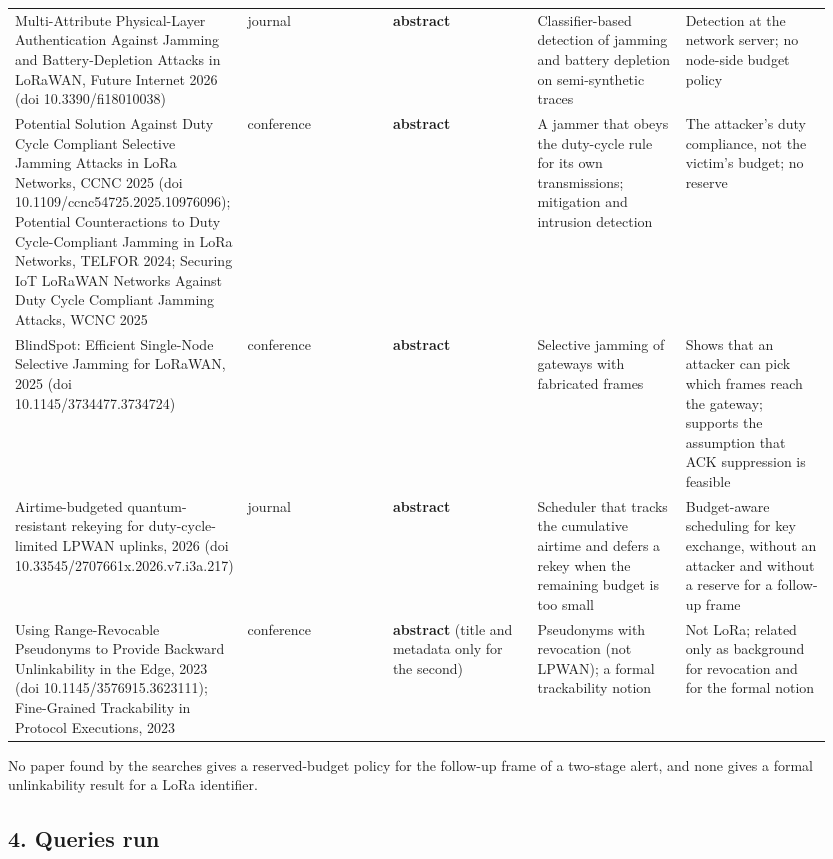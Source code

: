 {\begin{longtable}{p{0.190\linewidth}p{0.190\linewidth}p{0.190\linewidth}p{0.190\linewidth}p{0.190\linewidth}}
Multi-Attribute Physical-Layer Authentication Against Jamming and Battery-Depletion Attacks in LoRaWAN, Future Internet 2026 (doi 10.3390/fi18010038) & journal & \textbf{abstract} & Classifier-based detection of jamming and battery depletion on semi-synthetic traces & Detection at the network server; no node-side budget policy \\
Potential Solution Against Duty Cycle Compliant Selective Jamming Attacks in LoRa Networks, CCNC 2025 (doi 10.1109/ccnc54725.2025.10976096); Potential Counteractions to Duty Cycle-Compliant Jamming in LoRa Networks, TELFOR 2024; Securing IoT LoRaWAN Networks Against Duty Cycle Compliant Jamming Attacks, WCNC 2025 & conference & \textbf{abstract} & A jammer that obeys the duty-cycle rule for its own transmissions; mitigation and intrusion detection & The attacker's duty compliance, not the victim's budget; no reserve \\
BlindSpot: Efficient Single-Node Selective Jamming for LoRaWAN, 2025 (doi 10.1145/3734477.3734724) & conference & \textbf{abstract} & Selective jamming of gateways with fabricated frames & Shows that an attacker can pick which frames reach the gateway; supports the assumption that ACK suppression is feasible \\
Airtime-budgeted quantum-resistant rekeying for duty-cycle-limited LPWAN uplinks, 2026 (doi 10.33545/2707661x.2026.v7.i3a.217) & journal & \textbf{abstract} & Scheduler that tracks the cumulative airtime and defers a rekey when the remaining budget is too small & Budget-aware scheduling for key exchange, without an attacker and without a reserve for a follow-up frame \\
Using Range-Revocable Pseudonyms to Provide Backward Unlinkability in the Edge, 2023 (doi 10.1145/3576915.3623111); Fine-Grained Trackability in Protocol Executions, 2023 & conference & \textbf{abstract} (title and metadata only for the second) & Pseudonyms with revocation (not LPWAN); a formal trackability notion & Not LoRa; related only as background for revocation and for the formal notion \\
\bottomrule
\end{longtable}}

No paper found by the searches gives a reserved-budget policy for the follow-up frame of a two-stage alert, and none gives a formal unlinkability result for a LoRa identifier.

\subsection*{4. Queries run}

